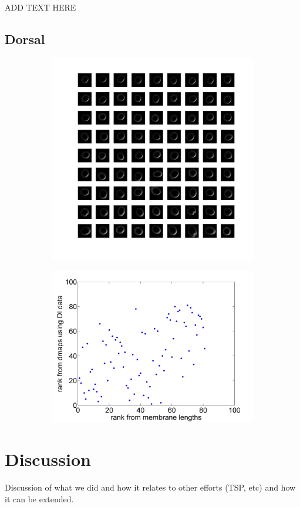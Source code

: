 \documentclass[12pt]{article}
\begin{document}
ADD TEXT HERE

\subsection{Dorsal}

\begin{figure}
\begin{subfigure}[c]{0.45\textwidth}
\includegraphics[width=\textwidth]{DI_array}
\caption{}
\end{subfigure}
\begin{subfigure}[c]{0.5\textwidth}
\includegraphics[width=\textwidth]{DI_rank_corr}
\caption{}
\end{subfigure}
\end{figure}

\section{Discussion}
Discussion of what we did and how it relates to other efforts (TSP, etc) and how it can be extended.




\end{document}
